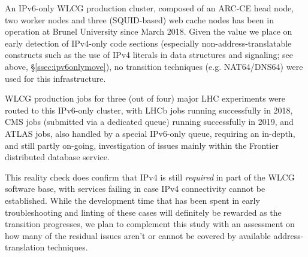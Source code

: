 %
An IPv6-only WLCG production cluster, composed of an ARC-CE head node,
two worker nodes and three (SQUID-based) web cache nodes has been
in operation at Brunel University since March 2018. Given the value
we place on early detection of IPv4-only code sections (especially
non-address-translatable constructs such as the use of IPv4 literals in
data structures and signaling; see above, \S\ref{ssec:ipv6onlymove}),
no transition techniques (e.g. NAT64/DNS64) were used for this
infrastructure.
\par
WLCG production jobs for three (out of four) major LHC experiments were routed
to this IPv6-only cluster, with LHCb jobs running successfully in
2018, CMS jobs (submitted via a dedicated queue) running successfully in 2019,
and ATLAS jobs, also handled by a special IPv6-only queue, requiring an
in-depth, and still partly on-going, investigation of issues mainly within the
Frontier \cite{frontier} distributed database
service.
\par
This reality check does confirm that IPv4 is still {\it required} in part
of the WLCG software base, with services failing in case IPv4 connectivity
cannot be established. While the development time that has been spent in 
early troubleshooting and linting of these cases will definitely be rewarded
as the transition progresses, we plan to complement this study with 
an assessment on how many of the residual issues aren't or cannot be covered
by available address-translation techniques.


